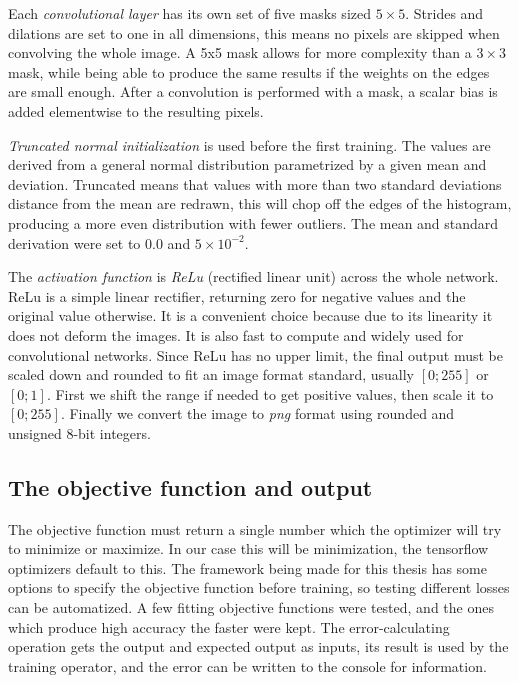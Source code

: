 \documentclass[12pt]{report}
\begin{document}
Each \textit{convolutional layer} has its own set of five masks sized $5\times5$. Strides and dilations are set to one in all dimensions, this means no pixels are skipped when convolving the whole image. A 5x5 mask allows for more complexity than a $3\times3$ mask, while being able to produce the same results if the weights on the edges are small enough. After a convolution is performed with a mask, a scalar bias is added elementwise to the resulting pixels.

\textit{Truncated normal initialization} \cite{trunc} is used before the first training. The values are derived from a general normal distribution parametrized by a given mean and deviation. Truncated means that values with more than two standard deviations distance from the mean are redrawn, this will chop off the edges of the histogram, producing a more even distribution with fewer outliers. The mean and standard derivation were set to $0.0$ and $ 5\times10^{-2} $.

The \textit{activation function} is \textit{ReLu} (rectified linear unit) \cite{relu} across the whole network. ReLu is a simple linear rectifier, returning zero for negative values and the original value otherwise. It is a convenient choice because due to its linearity it does not deform the images. It is also fast to compute and widely used for convolutional networks. Since ReLu has no upper limit, the final output must be scaled down and rounded to fit an image format standard, usually $ \left[0;255\right] $ or $ \left[0;1\right] $. First we shift the range if needed to get positive values, then scale it to $ \left[0;255\right] $. Finally we convert the image to \textit{png} format using rounded and unsigned 8-bit integers.
\subsection{The objective function and output}
The objective function must return a single number which the optimizer will try to minimize or maximize. In our case this will be minimization, the tensorflow optimizers default to this. The framework being made for this thesis has some options to specify the objective function before training, so testing different losses can be automatized. A few fitting objective functions were tested, and the ones which produce high accuracy the faster were kept. The error-calculating operation gets the output and expected output as inputs, its result is used by the training operator, and the error can be written to the console for information.
\end{document}
